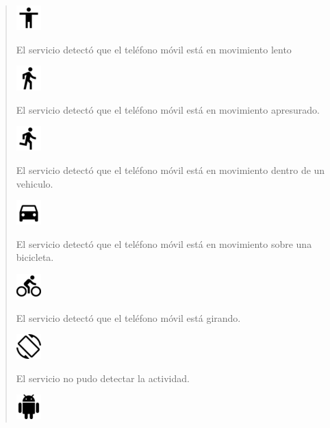 {\begin{quote}
\begin{description}
\includegraphics{anexos/graphics/still.png}

\item[{Caminando}] \leavevmode
El servicio detectó que el teléfono móvil está en movimiento lento  
    
\includegraphics{anexos/graphics/walk.png}

\item[{Correr}] \leavevmode
El servicio detectó que el teléfono móvil está en movimiento apresurado.

\includegraphics{anexos/graphics/run.png}

\item[{En vehiculo}] \leavevmode
El servicio detectó que el teléfono móvil está en movimiento dentro de un vehiculo.

\includegraphics{anexos/graphics/car.png}

\item[{En bicicleta}] \leavevmode
El servicio detectó que el teléfono móvil está en movimiento sobre una bicicleta.

\includegraphics{anexos/graphics/bike.png}

\item[{Tilting}] \leavevmode
El servicio detectó que el teléfono móvil está girando.

\includegraphics{anexos/graphics/tilt.png}

\item[{Desconocido}] \leavevmode
El servicio no pudo detectar la actividad.

\includegraphics{anexos/graphics/unk.png}


\end{description}
\end{quote}}
